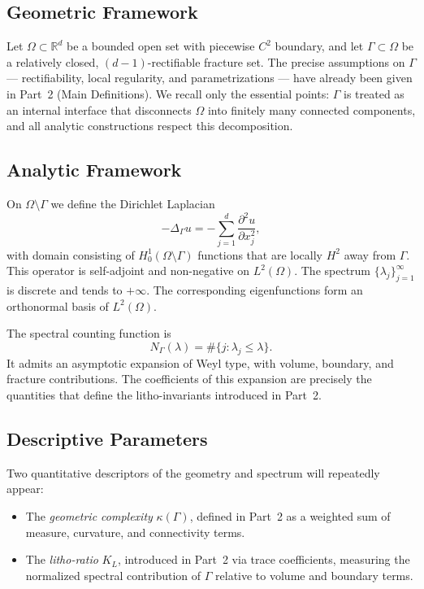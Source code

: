 \subsection{Geometric Framework}

Let $\Omega \subset \mathbb{R}^d$ be a bounded open set with piecewise $C^2$
boundary, and let $\Gamma \subset \Omega$ be a relatively closed, $(d-1)$-rectifiable
fracture set. The precise assumptions on $\Gamma$ --- rectifiability, local
regularity, and parametrizations --- have already been given in
Part~2 (Main Definitions). We recall only the essential points: $\Gamma$ is
treated as an internal interface that disconnects $\Omega$ into finitely many
connected components, and all analytic constructions respect this decomposition.

\subsection{Analytic Framework}

On $\Omega \setminus \Gamma$ we define the Dirichlet Laplacian
\[
  -\Delta_\Gamma u = -\sum_{j=1}^d \frac{\partial^2 u}{\partial x_j^2},
\]
with domain consisting of $H^1_0(\Omega \setminus \Gamma)$ functions that are
locally $H^2$ away from $\Gamma$. This operator is self-adjoint and non-negative
on $L^2(\Omega)$. The spectrum $\{\lambda_j\}_{j=1}^\infty$ is discrete and tends
to $+\infty$. The corresponding eigenfunctions form an orthonormal basis of
$L^2(\Omega)$.

The spectral counting function is
\[
  N_\Gamma(\lambda) = \#\{ j : \lambda_j \leq \lambda \}.
\]
It admits an asymptotic expansion of Weyl type, with volume, boundary, and
fracture contributions. The coefficients of this expansion are precisely the
quantities that define the litho-invariants introduced in Part~2.

\subsection{Descriptive Parameters}

Two quantitative descriptors of the geometry and spectrum will repeatedly
appear:

\begin{itemize}
  \item The \emph{geometric complexity} $\kappa(\Gamma)$, defined in Part~2 as a
  weighted sum of measure, curvature, and connectivity terms.
  \item The \emph{litho-ratio} $K_L$, introduced in Part~2 via trace coefficients,
  measuring the normalized spectral contribution of $\Gamma$ relative to volume
  and boundary terms.
\end{itemize}

